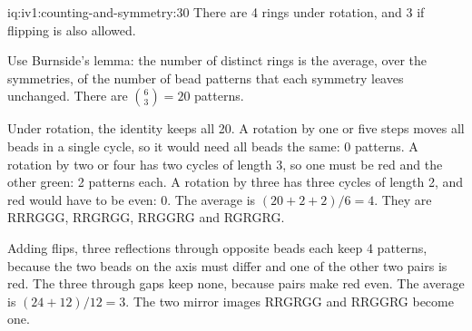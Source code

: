 \begin{solution}{iq:iv1:counting-and-symmetry:30}
There are 4 rings under rotation, and 3 if flipping is also allowed.

Use Burnside's lemma: the number of distinct rings is the average, over the symmetries, of the number of bead patterns that each symmetry leaves unchanged. There are $\binom{6}{3} = 20$ patterns.

Under rotation, the identity keeps all 20. A rotation by one or five steps moves all beads in a single cycle, so it would need all beads the same: 0 patterns. A rotation by two or four has two cycles of length 3, so one must be red and the other green: 2 patterns each. A rotation by three has three cycles of length 2, and red would have to be even: 0. The average is $(20 + 2 + 2)/6 = 4$. They are RRRGGG, RRGRGG, RRGGRG and RGRGRG.

Adding flips, three reflections through opposite beads each keep 4 patterns, because the two beads on the axis must differ and one of the other two pairs is red. The three through gaps keep none, because pairs make red even. The average is $(24 + 12)/12 = 3$. The two mirror images RRGRGG and RRGGRG become one.

\end{solution}

